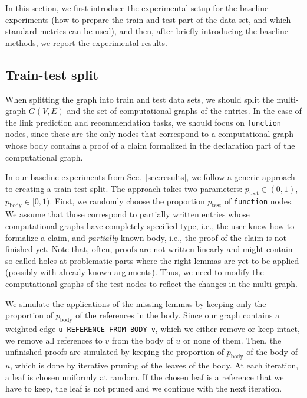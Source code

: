 \documentclass{article}
\begin{document}
In this section, we first introduce the experimental setup for the baseline experiments (how to prepare the train and test part of the data set, and which standard metrics can be used), and then, after briefly introducing the baseline methods, we report the experimental results.

\subsection{Train-test split}
When splitting the graph into train and test data sets, we should split the multi-graph $G(V, E)$ and the set of computational graphs of the entries. In the case of the link prediction and recommendation tasks, we should focus on \texttt{function} nodes, since these are the only nodes that correspond to a computational graph whose body contains a proof of a claim formalized in the declaration part of the computational graph.

In our baseline experiments from Sec.~\ref{sec:results}, we follow a generic approach to creating a train-test split. The approach takes two parameters: $p_\text{test} \in (0, 1)$, $p_\text{body} \in [0, 1)$. First, we randomly choose the proportion $p_\text{test}$ of \texttt{function} nodes. We assume that those correspond to partially written entries whose computational graphs have completely specified type, i.e., the user knew how to formalize a claim, and \emph{partially} known body, i.e., the proof of the claim is not finished yet. Note that, often, proofs are not written linearly and might contain so-called holes at problematic parts where the right lemmas are yet to be applied (possibly with already known arguments). Thus, we need to modify the computational graphs of the test nodes to reflect the changes in the multi-graph.

We simulate the applications of the missing lemmas by keeping only the proportion of $p_\text{body}$ of the references in the body. Since our graph contains a weighted edge \texttt{u REFERENCE FROM BODY v}, which we either remove or keep intact, we remove all references to $v$ from the body of $u$ or none of them. Then, the unfinished proofs are simulated by keeping the proportion of $p_\text{body}$ of the body of $u$, which is done by iterative pruning of the leaves of the body. At each iteration, a leaf is chosen uniformly at random. If the chosen leaf is a reference that we have to keep, the leaf is not pruned and we continue with the next iteration.
\end{document}
